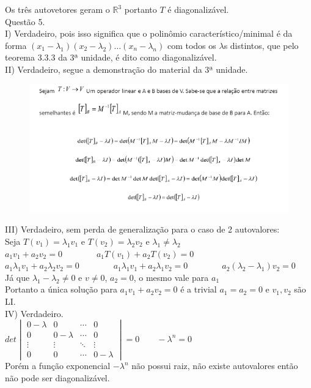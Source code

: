 \documentclass[12pt]{article}
\begin{document}
Os três autovetores geram o $\mathds{R}^{3}$ portanto $T$ é diagonalizável.\\

\noindent Questão 5.\\

\noindent I) Verdadeiro, pois isso significa que o polinômio característico/minimal é da forma $(x_{1}-\lambda_{1})(x_{2}-\lambda_{2})\dots(x_{n}-\lambda_{n})$ com todos os $\lambda$s distintos, que pelo teorema 3.3.3 da 3ª unidade, é dito como diagonalizável.\\

\noindent II) Verdadeiro, segue a demonstração do material da 3ª unidade.\\

\begin{figure}[h!]
	\includegraphics[scale=0.8]{q5b}
\end{figure}

\noindent III) Verdadeiro, sem perda de generalização para o caso de 2 autovalores:\\

Seja $T(v_{1})=\lambda_{1}v_{1}$ e $T(v_{2})=\lambda_{2}v_{2}$ e $\lambda_{1}\neq\lambda_{2}$\\

$a_{1}v_{1}+a_{2}v_{2}=0\qquad\qquad a_{1}T(v_{1})+a_{2}T(v_{2})=0$\\

$a_{1}\lambda_{1}v_{1}+a_{2}\lambda_{2}v_{2}=0\qquad\qquad a_{1}\lambda_{1}v_{1}+a_{2}\lambda_{1}v_{2}=0\qquad\qquad a_{2}(\lambda_{2}-\lambda_{1})v_{2}=0$\\

Já que $\lambda_{1}-\lambda_{2}\neq0$ e $v\neq0$, $a_{2}=0$, o mesmo vale para $a_{1}$\\

Portanto a única solução para $a_{1}v_{1}+a_{2}v_{2}=0$ é a trivial $a_{1}=a_{2}=0$ e $v_{1},v_{2}$ são LI.\\

\noindent IV) Verdadeiro.\\

$det\begin{vmatrix}0-\lambda&0&\cdots&0\\0&0-\lambda&\cdots&0\\\vdots&\vdots&\ddots&\vdots\\0&0&\cdots&0-\lambda\end{vmatrix}=0\qquad -\lambda^{n}=0$\\

Porém a função exponencial $-\lambda^{n}$ não possui raiz, não existe autovalores então não pode ser diagonalizável.\\
\end{document}
